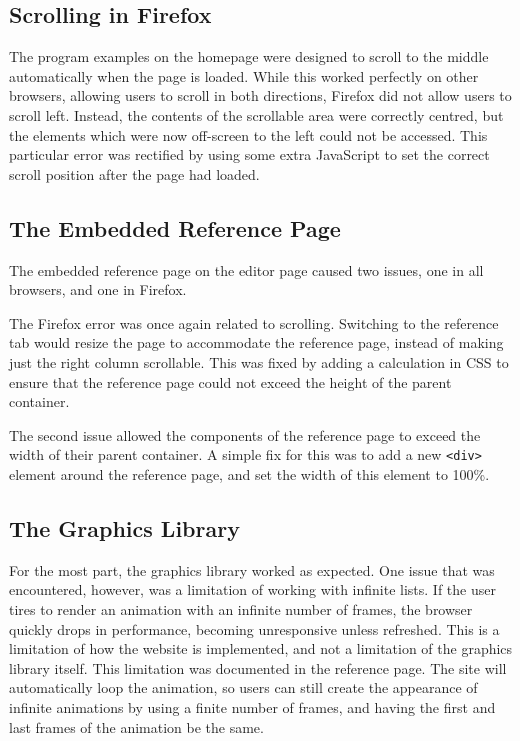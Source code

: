 \documentclass[../main.tex]{subfiles}
\begin{document}
        \subsection{Scrolling in Firefox}
            The program examples on the homepage were designed to scroll to the middle
                automatically when the page is loaded.
            While this worked perfectly on other browsers, allowing users to scroll in both
                directions, Firefox did not allow users to scroll left.
            Instead, the contents of the scrollable area were correctly centred, but the
                elements which were now off-screen to the left could not be accessed.
            This particular error was rectified by using some extra JavaScript to set the
                correct scroll position after the page had loaded.

        \subsection{The Embedded Reference Page}
            The embedded reference page on the editor page caused two issues, one in all
                browsers, and one in Firefox.

            The Firefox error was once again related to scrolling.
            Switching to the reference tab would resize the page to accommodate the
                reference page, instead of making just the right column scrollable.
            This was fixed by adding a calculation in CSS to ensure that the reference page
                could not exceed the height of the parent container.

            The second issue allowed the components of the reference page to exceed the
                width of their parent container.
            A simple fix for this was to add a new \texttt{<div>} element around the
                reference page, and set the width of this element to 100\%.

        \subsection{The Graphics Library}
            For the most part, the graphics library worked as expected.
            One issue that was encountered, however, was a limitation of working with
                infinite lists.
            If the user tires to render an animation with an infinite number of frames, the
                browser quickly drops in performance, becoming unresponsive unless refreshed.
            This is a limitation of how the website is implemented, and not a limitation of
                the graphics library itself.
            This limitation was documented in the reference page.
            The site will automatically loop the animation, so users can still create the
                appearance of infinite animations by using a finite number of frames, and
                having the first and last frames of the animation be the same.
\end{document}
